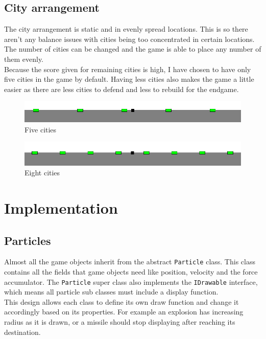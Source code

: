 \documentclass{article}
\newcommand{\n}[0]{\\[\baselineskip]}
\begin{document}
\subsection{City arrangement}
The city arrangement is static and in evenly spread locations. This is so there aren't any balance issues with cities being too concentrated in certain locations. The number of cities can be changed and the game is able to place any number of them evenly. 
\n
Because the score given for remaining cities is high, I have chosen to have only five cities in the game by default. Having less cities also makes the game a little easier as there are less cities to defend and less to rebuild for the endgame. 
\begin{figure}[H]
\centering
\includegraphics[width=1\textwidth, keepaspectratio]{imgs/FiveCities.png}
\caption{Five cities}
\end{figure}

\begin{figure}[H]
\centering
\includegraphics[width=1\textwidth, keepaspectratio]{imgs/EightCities.png}
\caption{Eight cities}
\end{figure}
\noindent

\section{Implementation}
\subsection{Particles}
Almost all the game objects inherit from the abstract \texttt{Particle} class. This class contains all the fields that game objects need like position, velocity and the force accumulator. The \texttt{Particle} super class also implements the \texttt{IDrawable} interface, which means all particle sub classes must include a display function.
\n
This design allows each class to define its own draw function and change it accordingly based on its properties. For example an explosion has increasing radius as it is drawn, or a missile should stop displaying after reaching its destination. 
\end{document}
